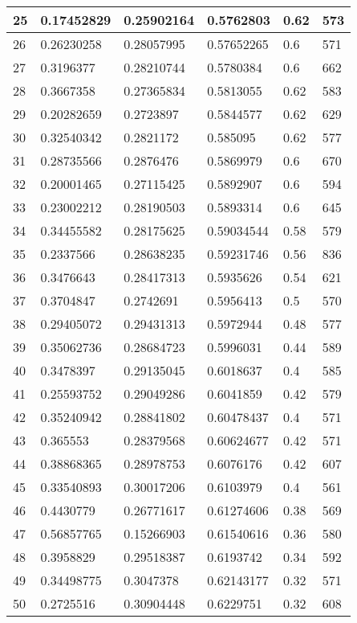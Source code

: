 \begin{longtable}{|l|l|l|l|l|l|}
25 & 0.17452829 & 0.25902164 & 0.5762803 & 0.62 & 573 \\ \hline 
26 & 0.26230258 & 0.28057995 & 0.57652265 & 0.6 & 571 \\ \hline 
27 & 0.3196377 & 0.28210744 & 0.5780384 & 0.6 & 662 \\ \hline 
28 & 0.3667358 & 0.27365834 & 0.5813055 & 0.62 & 583 \\ \hline 
29 & 0.20282659 & 0.2723897 & 0.5844577 & 0.62 & 629 \\ \hline 
30 & 0.32540342 & 0.2821172 & 0.585095 & 0.62 & 577 \\ \hline 
31 & 0.28735566 & 0.2876476 & 0.5869979 & 0.6 & 670 \\ \hline 
32 & 0.20001465 & 0.27115425 & 0.5892907 & 0.6 & 594 \\ \hline 
33 & 0.23002212 & 0.28190503 & 0.5893314 & 0.6 & 645 \\ \hline 
34 & 0.34455582 & 0.28175625 & 0.59034544 & 0.58 & 579 \\ \hline 
35 & 0.2337566 & 0.28638235 & 0.59231746 & 0.56 & 836 \\ \hline 
36 & 0.3476643 & 0.28417313 & 0.5935626 & 0.54 & 621 \\ \hline 
37 & 0.3704847 & 0.2742691 & 0.5956413 & 0.5 & 570 \\ \hline 
38 & 0.29405072 & 0.29431313 & 0.5972944 & 0.48 & 577 \\ \hline 
39 & 0.35062736 & 0.28684723 & 0.5996031 & 0.44 & 589 \\ \hline 
40 & 0.3478397 & 0.29135045 & 0.6018637 & 0.4 & 585 \\ \hline 
41 & 0.25593752 & 0.29049286 & 0.6041859 & 0.42 & 579 \\ \hline 
42 & 0.35240942 & 0.28841802 & 0.60478437 & 0.4 & 571 \\ \hline 
43 & 0.365553 & 0.28379568 & 0.60624677 & 0.42 & 571 \\ \hline 
44 & 0.38868365 & 0.28978753 & 0.6076176 & 0.42 & 607 \\ \hline 
45 & 0.33540893 & 0.30017206 & 0.6103979 & 0.4 & 561 \\ \hline 
46 & 0.4430779 & 0.26771617 & 0.61274606 & 0.38 & 569 \\ \hline 
47 & 0.56857765 & 0.15266903 & 0.61540616 & 0.36 & 580 \\ \hline 
48 & 0.3958829 & 0.29518387 & 0.6193742 & 0.34 & 592 \\ \hline 
49 & 0.34498775 & 0.3047378 & 0.62143177 & 0.32 & 571 \\ \hline 
50 & 0.2725516 & 0.30904448 & 0.6229751 & 0.32 & 608 \\ \hline 
\end{longtable}
